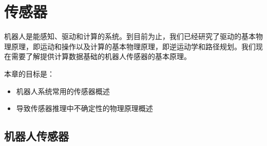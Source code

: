\chapter{传感器}
\label{chap:sensors}

机器人是能感知、驱动和计算的系统。到目前为止，我们已经研究了驱动的基本物理原理，即运动和操作以及计算的基本物理原理，即逆运动学和路径规划。我们现在需要了解提供计算数据基础的机器人传感器的基本原理。


本章的目标是：
\begin{itemize}

\item 机器人系统常用的传感器概述
\item 导致传感器推理中不确定性的物理原理概述
\end{itemize}


\section{机器人传感器}

